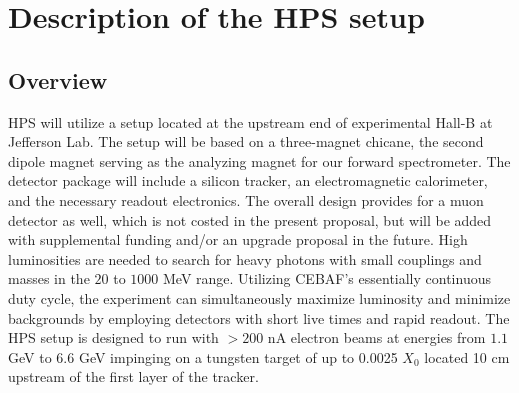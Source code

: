 \section{Description of the HPS setup}
\label{setup}

\subsection{Overview } 


HPS will utilize a setup located at the upstream end of  experimental Hall-B at Jefferson Lab. The setup will be based on a three-magnet chicane, the second dipole magnet serving as the analyzing magnet for our forward spectrometer. The detector package will include a silicon tracker, an electromagnetic calorimeter, and the necessary readout electronics. The overall design provides for a muon detector as well, which is not costed in the present proposal, but will be added with supplemental funding and/or an upgrade proposal in the future. High luminosities are needed to search for heavy photons with small couplings and masses in the $20$ to $1000$ MeV range. Utilizing CEBAF's essentially continuous duty cycle, the experiment can simultaneously maximize luminosity and minimize backgrounds by employing detectors with short live times and rapid readout. The HPS setup is designed to run with $> 200$ nA electron beams at energies from $1.1$ GeV to $6.6$ GeV impinging on a tungsten target of up to 0.0025 $X_{0}$ located  10 cm upstream of the first layer of the tracker.

